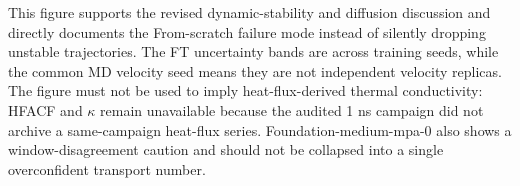 This figure supports the revised dynamic-stability and diffusion discussion and directly documents the From-scratch failure mode instead of silently dropping unstable trajectories. The FT uncertainty bands are across training seeds, while the common MD velocity seed means they are not independent velocity replicas. The figure must not be used to imply heat-flux-derived thermal conductivity: HFACF and $\kappa$ remain unavailable because the audited 1 ns campaign did not archive a same-campaign heat-flux series. Foundation-medium-mpa-0 also shows a window-disagreement caution and should not be collapsed into a single overconfident transport number.
